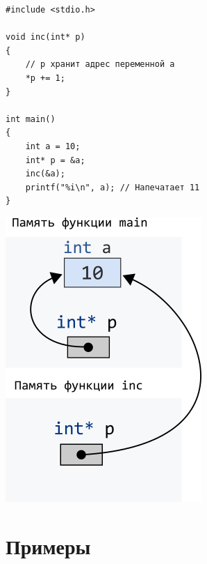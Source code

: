 \documentclass{article}
\begin{document}
\begin{multicols}{2}
\noindent
\begin{lstlisting}
#include <stdio.h>

void inc(int* p)
{
    // p хранит адрес переменной a
    *p += 1; 
}

int main()
{
    int a = 10;
    int* p = &a;
    inc(&a);
    printf("%i\n", a); // Напечатает 11
}
\end{lstlisting}

\begin{center}
\includegraphics[scale=0.62]{../images/intpassbypointer.png}
\end{center}
\end{multicols}

\section*{Примеры}
\end{document}

